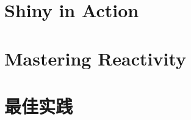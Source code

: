 \documentclass{book}
\begin{document}
\frontmatter
\tableofcontents
\mainmatter



\part{Shiny in Action}







\part{Mastering Reactivity}




\part{最佳实践}

\end{document}
